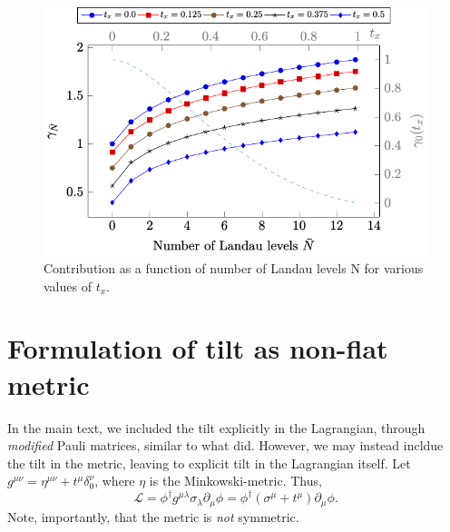 \documentclass[%
 reprint,
 amsmath,amssymb,
 aps,
]{revtex4-2}
\begin{document}
\begin{figure}[p]
  \centering
  \includegraphics[width=.8\textwidth]{figures/contribtx}
  \caption{\label{fig:contribtx}Contribution as a function of number of Landau levels N for various values of \(t_x\).}
\end{figure}

\appendix
\section{Formulation of tilt as non-flat metric}\label{sec:tilt-metric}
In the main text, we included the tilt explicitly in the Lagrangian, through \emph{modified} Pauli matrices, similar to what \textcite{vanderwurffMagnetovorticalThermoelectricTransport2019} did.
However, we may instead incldue the tilt in the metric, leaving to explicit tilt in the Lagrangian itself.
Let \( g^{\mu \nu} = \eta^{\mu \nu} + t^{\mu} \delta^{\nu}_0 \), where \( \eta \) is the Minkowski-metric. Thus,
\begin{equation}
  \label{eq:8}
  \mathcal{L}
  = \phi^{\dagger} g^{\mu \lambda} \sigma_{\lambda} \partial_{\mu} \phi
  = \phi^{\dagger}(\sigma^{\mu} + t^{\mu}) \partial_{\mu} \phi.
\end{equation}
Note, importantly, that the metric is \emph{not} symmetric.


\end{document}
